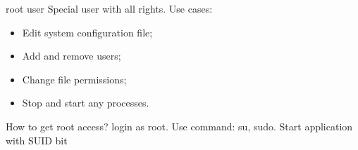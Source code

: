 \begin{frame}[fragile]{root user}
 Special user with all rights. Use cases:
  \begin{itemize} 
    \item Edit system configuration file;
    \item Add and remove users;
    \item Change file permissions;
    \item Stop and start any processes.
  \end{itemize}
How to get root access? 
 \break
  login as root. Use command: su, sudo. Start application with SUID bit 
\end{frame}
